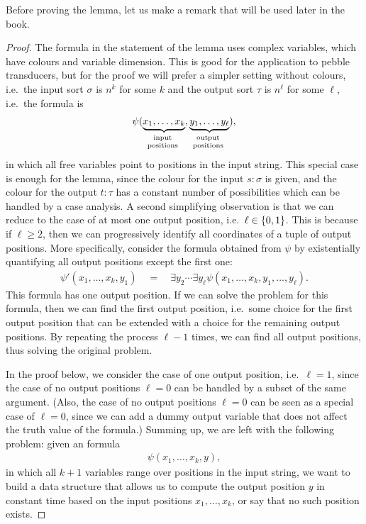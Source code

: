 Before proving the lemma, let us make a remark that will be used later in the book. 

\begin{proof} The formula in the statement of the lemma uses complex variables, which have colours and variable dimension. This is good for the application to pebble transducers, but for the proof we will prefer a simpler setting without colours, i.e.~the  input sort $\sigma$ is $n^k$ for some $k$ and the output sort $\tau$ is $n^\ell$ for some $\ell$, i.e.~the formula is 
     \begin{align*}
    \psi(\myunderbrace{x_1,\ldots,x_k}{input\\ positions}, \myunderbrace{y_1,\ldots,y_\ell}{output\\ positions}),
    \end{align*}
in which all free variables point to positions in the input string.
    This special case is enough for the lemma, since the colour for the input  $s : \sigma$ is given, and the colour for the output $t : \tau$ has a constant number of  possibilities which can be handled by a case analysis. A second simplifying observation is that we can reduce to the case of at most  one output position, i.e.~$\ell \in \{0,1\}$.    
    This is because if $\ell \ge 2$, then we can progressively identify all coordinates of a tuple of output positions. More specifically,  consider the formula obtained from $\psi$ by existentially quantifying all output positions except the first one:
\begin{align*}
\psi'(x_1,\ldots,x_k, y_1) \quad = \quad \exists y_2 \cdots \exists y_\ell \psi(x_1,\ldots,x_k, y_1,\ldots,y_\ell).
\end{align*}
This formula has one output position. If we can solve the problem for this formula, then we can find the first output position, i.e.~some choice for the first output position that can be extended with a choice for the remaining output positions. By repeating the process $\ell-1$ times, we can find all output positions, thus solving the original problem.  

In the proof below, we consider the case of one output position, i.e.~$\ell=1$, since the case of no output positions $\ell=0$ can be handled by a subset of the same argument. (Also,  the case of no output positions $\ell=0$  can be seen as a special case of $\ell=0$, since we can add a dummy output variable that does not affect the truth value of the formula.)
Summing up, we are left with the following problem: given an \mso formula 
\begin{align*}
\psi(x_1,\ldots,x_k, y),
\end{align*}
in which all $k+1$ variables range over positions in the input string,  we want to build a data structure that allows us to compute the output position $y$ in constant time based on the input positions $x_1,\ldots,x_k$, or say that no such position exists. 


\end{proof}
